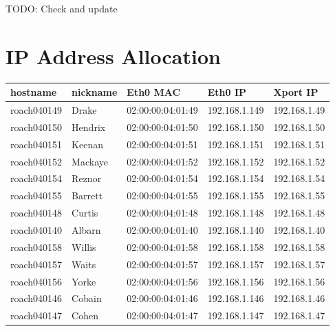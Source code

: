 \documentclass[letterpaper,10pt,english]{sphinxmanual}
\begin{document}
TODO: Check and update


\section{IP Address Allocation}
\label{ip_allocation:ip-address-allocation}
\begin{tabulary}{\linewidth}{|L|L|L|L|L|}
\hline
\textbf{\relax 
hostname
} & \textbf{\relax 
nickname
} & \textbf{\relax 
Eth0 MAC
} & \textbf{\relax 
Eth0 IP
} & \textbf{\relax 
Xport IP
}\\\hline

roach040149
 & 
Drake
 & 
02:00:00:04:01:49
 & 
192.168.1.149
 & 
192.168.1.49
\\\hline

roach040150
 & 
Hendrix
 & 
02:00:00:04:01:50
 & 
192.168.1.150
 & 
192.168.1.50
\\\hline

roach040151
 & 
Keenan
 & 
02:00:00:04:01:51
 & 
192.168.1.151
 & 
192.168.1.51
\\\hline

roach040152
 & 
Mackaye
 & 
02:00:00:04:01:52
 & 
192.168.1.152
 & 
192.168.1.52
\\\hline

roach040154
 & 
Reznor
 & 
02:00:00:04:01:54
 & 
192.168.1.154
 & 
192.168.1.54
\\\hline

roach040155
 & 
Barrett
 & 
02:00:00:04:01:55
 & 
192.168.1.155
 & 
192.168.1.55
\\\hline

roach040148
 & 
Curtis
 & 
02:00:00:04:01:48
 & 
192.168.1.148
 & 
192.168.1.48
\\\hline

roach040140
 & 
Albarn
 & 
02:00:00:04:01:40
 & 
192.168.1.140
 & 
192.168.1.40
\\\hline

roach040158
 & 
Willis
 & 
02:00:00:04:01:58
 & 
192.168.1.158
 & 
192.168.1.58
\\\hline

roach040157
 & 
Waits
 & 
02:00:00:04:01:57
 & 
192.168.1.157
 & 
192.168.1.57
\\\hline

roach040156
 & 
Yorke
 & 
02:00:00:04:01:56
 & 
192.168.1.156
 & 
192.168.1.56
\\\hline

roach040146
 & 
Cobain
 & 
02:00:00:04:01:46
 & 
192.168.1.146
 & 
192.168.1.46
\\\hline

roach040147
 & 
Cohen
 & 
02:00:00:04:01:47
 & 
192.168.1.147
 & 
192.168.1.47
\\\hline
\end{tabulary}
\end{document}
